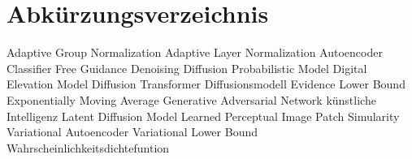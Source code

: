 \chapter*{Abkürzungsverzeichnis}

\begin{acronym}[AdaGN]
        {Adaptive Group Normalization}
        {Adaptive Layer Normalization}
           {Autoencoder}
          {Classifier Free Guidance}
         {Denoising Diffusion Probabilistic Model}
          {Digital Elevation Model}
          {Diffusion Transformer}
           {Diffusionsmodell}
         {Evidence Lower Bound}
          {Exponentially Moving Average}
          {Generative Adversarial Network}
           {künstliche Intelligenz}
          {Latent Diffusion Model}
        {Learned Perceptual Image Patch Simularity}
          {Variational Autoencoder}
          {Variational Lower Bound}
          {Wahrscheinlichkeitsdichtefuntion}
\end{acronym}
